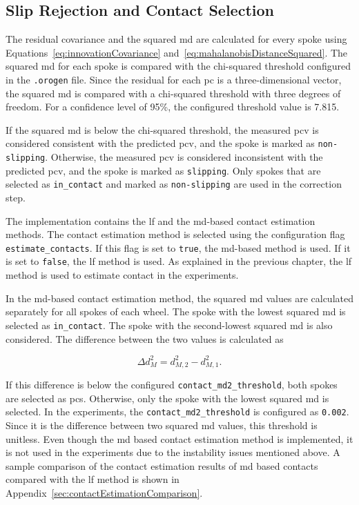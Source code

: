 \documentclass[report.tex]{subfiles}
\begin{document}
    
    \subsection{Slip Rejection and Contact Selection}
    \label{subsec:implementationSlipRejectionContactSelection}

    The residual covariance and the squared \gls{md} are calculated for every spoke using Equations~\ref{eq:innovationCovariance} and~\ref{eq:mahalanobisDistanceSquared}. The squared \gls{md} for each spoke is compared with the chi-squared threshold configured in the \texttt{.orogen} file. Since the residual for each \gls{pc} is a three-dimensional vector, the squared \gls{md} is compared with a chi-squared threshold with three degrees of freedom. For a confidence level of 95\%, the configured threshold value is 7.815.

    If the squared \gls{md} is below the chi-squared threshold, the measured \gls{pcv} is considered consistent with the predicted \gls{pcv}, and the spoke is marked as \texttt{non-slipping}. Otherwise, the measured \gls{pcv} is considered inconsistent with the predicted \gls{pcv}, and the spoke is marked as \texttt{slipping}. Only spokes that are selected as \texttt{in\_contact} and marked as \texttt{non-slipping} are used in the correction step.

    The implementation contains the \gls{lf} and the \gls{md}-based contact estimation methods. The contact estimation method is selected using the configuration flag \texttt{estimate\_contacts}. If this flag is set to \texttt{true}, the \gls{md}-based method is used. If it is set to \texttt{false}, the \gls{lf} method is used. As explained in the previous chapter, the \gls{lf} method is used to estimate contact in the experiments.

    In the \gls{md}-based contact estimation method, the squared \gls{md} values are calculated separately for all spokes of each wheel. The spoke with the lowest squared \gls{md} is selected as \texttt{in\_contact}. The spoke with the second-lowest squared \gls{md} is also considered. The difference between the two values is calculated as

    \begin{equation}
        \Delta d_M^2 = d_{M,2}^2 - d_{M,1}^2.
    \end{equation}

    If this difference is below the configured \texttt{contact\_md2\_threshold}, both spokes are selected as \glspl{pc}. Otherwise, only the spoke with the lowest squared \gls{md} is selected. In the experiments, the \texttt{contact\_md2\_threshold} is configured as \texttt{0.002}. Since it is the difference between two squared \gls{md} values, this threshold is unitless. Even though the \gls{md} based contact estimation method is implemented, it is not used in the experiments due to the instability issues mentioned above. A sample comparison of the contact estimation results of \gls{md} based contacts compared with the \gls{lf} method is shown in Appendix~\ref{sec:contactEstimationComparison}. 
    
\end{document}
